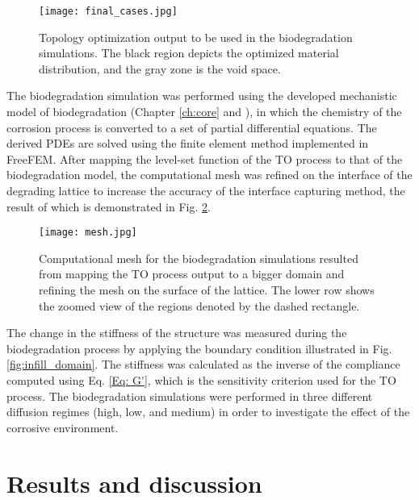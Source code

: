 \begin{figure}[h]
\centering
\medskip
\texttt{[image: final\_cases.jpg]}
\caption[Topology optimization output to be used in the biodegradation simulations]{Topology optimization output to be used in the biodegradation simulations. The black region depicts the optimized material distribution, and the gray zone is the void space. } \label{fig:infill_final_cases}
\end{figure}

The biodegradation simulation was performed using the developed mechanistic model of biodegradation (Chapter \ref{ch:core} and \cite{Barzegari2021}), in which the chemistry of the corrosion process is converted to a set of partial differential equations. The derived \gls{PDE}s are solved using the finite element method implemented in FreeFEM. After mapping the level-set function of the \gls{TO} process to that of the biodegradation model, the computational mesh was refined on the interface of the degrading lattice to increase the accuracy of the interface capturing method, the result of which is demonstrated in Fig. \ref{fig:infill_mesh}.


\begin{figure}[h]
\centering
\medskip
\texttt{[image: mesh.jpg]}
\caption[Computational mesh for the biodegradation simulations]{Computational mesh for the biodegradation simulations resulted from mapping the \gls{TO} process output to a bigger domain and refining the mesh on the surface of the lattice. The lower row shows the zoomed view of the regions denoted by the dashed rectangle.} \label{fig:infill_mesh}
\end{figure}

The change in the stiffness of the structure was measured during the biodegradation process by applying the boundary condition illustrated in Fig. \ref{fig:infill_domain}. The stiffness was calculated as the inverse of the compliance computed using Eq. \ref{Eq: G'}, which is the sensitivity criterion used for the \gls{TO} process. The biodegradation simulations were performed in three different diffusion regimes (high, low, and medium) in order to investigate the effect of the corrosive environment.



\section{Results and discussion}\label{section:infill_results}

